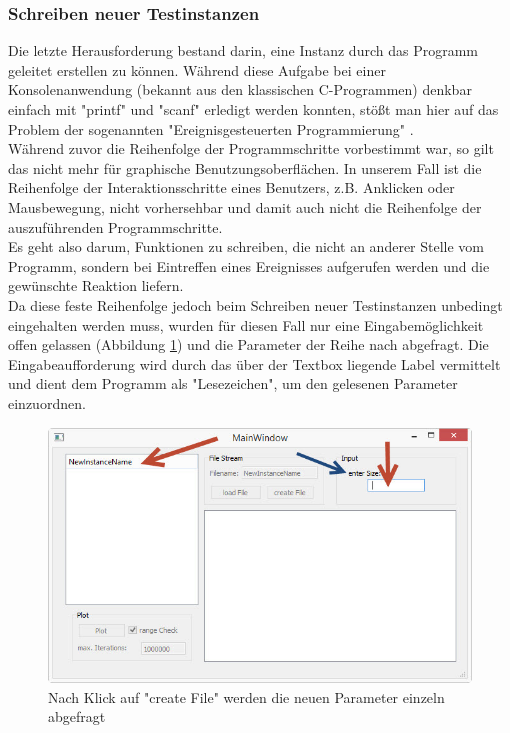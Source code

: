 \documentclass[11pt, a4paper, german]{article}
\theoremstyle{plain}
\begin{document}
	\subsubsection{Schreiben neuer Testinstanzen}
	Die letzte Herausforderung bestand darin, eine Instanz durch das Programm geleitet erstellen zu können. Während diese Aufgabe bei einer Konsolenanwendung (bekannt aus den klassischen C-Programmen) denkbar einfach mit "{}printf"{} und "{}scanf"{} erledigt werden konnten, stößt man hier auf das Problem der sogenannten "{}Ereignisgesteuerten Programmierung"{} \cite{breymann2011c++}.\\
	Während zuvor die Reihenfolge der Programmschritte vorbestimmt war, so gilt das nicht mehr für graphische Benutzungsoberflächen. In unserem Fall ist die Reihenfolge der Interaktionsschritte eines Benutzers, z.B. Anklicken oder Mausbewegung, nicht vorhersehbar und damit auch nicht die Reihenfolge der auszuführenden Programmschritte.\\
	Es geht also darum, Funktionen zu schreiben, die nicht an anderer Stelle vom Programm, sondern bei Eintreffen eines Ereignisses aufgerufen werden und die gewünschte Reaktion liefern.\\
	Da diese feste Reihenfolge jedoch beim Schreiben neuer Testinstanzen unbedingt eingehalten werden muss, wurden für diesen Fall nur eine Eingabemöglichkeit offen gelassen (Abbildung \ref{fig:MainWindow_createFile}) und die Parameter der Reihe nach abgefragt. Die Eingabeaufforderung wird durch das über der Textbox liegende Label vermittelt und dient dem Programm als "{}Lesezeichen"{}, um den gelesenen Parameter einzuordnen.\\
	\begin{figure}[H]
		\centering
		\includegraphics[width=1\linewidth]{./Pictures/MainWindow_createFile}
		\caption[erstelle Datei]{Nach Klick auf "{}create File"{} werden die neuen Parameter einzeln abgefragt}
		\label{fig:MainWindow_createFile}
	\end{figure}
	
\end{document}
